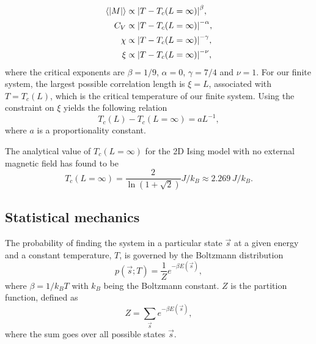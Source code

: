\begin{align}
    \expval{\abs{M}} & \propto \abs{T - T_c(L=\infty)}^\beta, \label{eq:crit_expo_mag} \\
    C_V & \propto \abs{T - T_c(L=\infty)}^{-\alpha}, \label{eq:crit_expo_heatcap} \\ 
    \chi & \propto \abs{T - T_c(L=\infty)}^{-\gamma}, \label{eq:crit_expo_mag_susc} \\ 
    \xi & \propto \abs{T - T_c(L=\infty)}^{-\nu}, \label{eq:crit_expo_corr_length}
\end{align}
where the critical exponents are $\beta=1/9$, $\alpha=0$, $\gamma=7/4$ and $\nu=1$. For our finite system, the largest possible correlation length is $\xi=L$, associated with $T=T_c(L)$, which is the critical temperature of our finite system. Using the constraint on $\xi$ yields the following relation 
\begin{equation}
    T_c(L) - T_c(L=\infty) = aL^{-1}, \label{eq:finite_size_scaling_relation}
\end{equation}  
where $a$ is a proportionality constant. 

The analytical value of $T_c(L=\infty)$ for the 2D Ising model with no external magnetic field has found to be \cite{Onsager_Ising2D}
\begin{equation}
    T_c(L=\infty) = \frac{2}{\ln(1+\sqrt{2})} J/k_B \approx 2.269\,J/k_B. \label{eq:onsager_critical_temperature}
\end{equation}


\subsection{Statistical mechanics}\label{subsec_theory:statistical_mechanics}

The probability of finding the system in a particular state $\vec{s}$ at a given energy and a constant temperature, $T$, is governed by the Boltzmann distribution 
\begin{equation}\label{eq:boltzmann_distr}
    p(\vec{s};T) = \frac{1}{Z}e^{-\beta E(\vec{s})},
\end{equation} 
where $\beta=1/k_B T$ with $k_B$ being the Boltzmann constant. $Z$ is the partition function, defined as 
\begin{equation}\label{eq:partition_function}
    Z = \sum_\vec{s} e^{-\beta E(\vec{s})},
\end{equation}  
where the sum goes over all possible states $\vec{s}$. 

